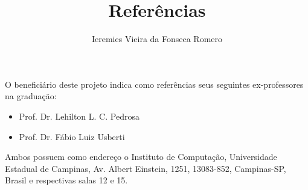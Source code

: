 \documentclass[11pt]{article}
\author{Ieremies Vieira da Fonseca Romero}
\date{}
\title{Referências}
\begin{document}
\maketitle
O beneficiário deste projeto indica como referências seus seguintes ex-professores na graduação:
\begin{itemize}
\item Prof. Dr. Lehilton L. C. Pedrosa
\item Prof. Dr. Fábio Luiz Usberti
\end{itemize}

Ambos possuem como endereço o Instituto de Computação, Universidade Estadual de Campinas, Av. Albert Einstein, 1251, 13083-852, Campinas-SP, Brasil e respectivas salas 12 e 15.
\end{document}
